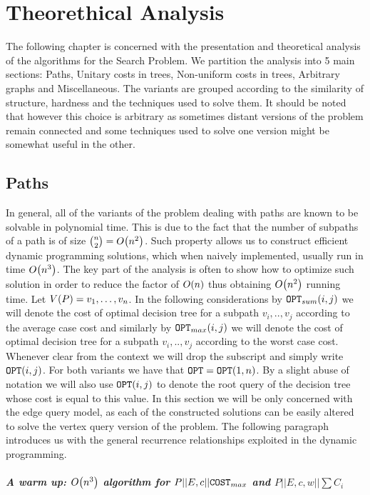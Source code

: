 \chapter{Theorethical Analysis}

The following chapter is concerned with the presentation and theoretical analysis of the algorithms for the Search Problem. We partition the analysis into 5 main sections: Paths, Unitary costs in trees, Non-uniform costs in trees, Arbitrary graphs and Miscellaneous. The variants are grouped according to the similarity of structure, hardness and the techniques used to solve them. It should be noted that however this choice is arbitrary as sometimes distant versions of the problem remain connected and some techniques used to solve one version might be somewhat useful in the other.
\section{Paths}
In general, all of the variants of the problem dealing with paths are known to be solvable in polynomial time. This is due to the fact that the number of subpaths of a path is of size $\binom{n}{2}=O\mathopen{}\left( n^2 \right)$. Such property allows us to construct efficient dynamic programming solutions, which when naively implemented, usually run in time $O\mathopen{}\left( n^3 \right)$. The key part of the analysis is often to show how to optimize such solution in order to reduce the factor of $O\mathopen{}\left( n \right)$ thus obtaining $O\mathopen{}\left( n^2 \right)$ running time.
Let $V\mathopen{}\left( P \right)=v_1,\dots,v_n$. In the following considerations by  $\texttt{OPT}_{sum}\mathopen{}\left( i,j \right)$ we will denote the cost of optimal decision tree for a subpath $v_i,..,v_j$ according to the average case cost and similarly by $\texttt{OPT}_{max}\mathopen{}\left( i,j \right)$ we will denote the cost of optimal decision tree for a subpath $v_i,..,v_j$ according to the worst case cost. Whenever clear from the context we will drop the subscript and simply write $\texttt{OPT}\mathopen{}\left( i,j \right)$. For both variants we have that $\texttt{OPT}=\texttt{OPT}\mathopen{}\left( 1,n \right)$. By a slight abuse of notation we will also use $\texttt{OPT}\mathopen{}\left( i,j \right)$ to denote the root query of the decision tree whose cost is equal to this value.
In this section we will be only concerned with the edge query model, as each of the constructed solutions can be easily altered to solve the vertex query version of the problem. The following paragraph introduces us with the general recurrence relationships exploited in the dynamic programming. 
\paragraph{A warm up: $O\mathopen{}\left( n^3 \right)$ algorithm for $P||E,c|| \texttt{COST}_{max}$ and $P||E,c, w|| \sum C_i$}

